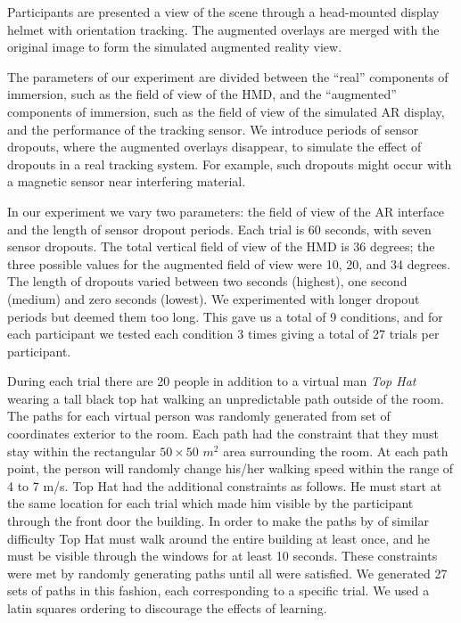 \documentclass{acmsiggraph}                     %
\begin{document}
Participants are presented a view of the scene through a head-mounted display helmet with orientation tracking.  The augmented overlays are merged with the original image to form the simulated augmented reality view.

The parameters of our experiment are divided between the ``real'' components of immersion, such as the field of view of the HMD, and the ``augmented'' components of immersion, such as the field of view of the simulated AR display, and the performance of the tracking sensor.  We introduce periods of sensor dropouts, where the augmented overlays disappear, to simulate the effect of dropouts in a real tracking system.  For example, such dropouts might occur with a magnetic sensor near interfering material.

In our experiment we vary two parameters: the field of view of the AR interface and the length of sensor dropout periods.  Each trial is 60 seconds, with seven sensor dropouts.  The total vertical field of view of the HMD is 36 degrees; the three possible values for the augmented field of view were 10, 20, and 34 degrees.  The length of dropouts varied between two seconds (highest), one second (medium) and zero seconds (lowest).  We experimented with longer dropout periods but deemed them too long.  This gave us a total of 9 conditions, and for each participant we tested each condition 3 times giving a total of 27 trials per participant.

During each trial there are 20 people in addition to a virtual man \emph{Top Hat} wearing a tall black top hat walking an unpredictable path outside of the room.  The paths for each virtual person was randomly generated from set of coordinates exterior to the room.  Each path had the constraint that they must stay within the rectangular $50\times50$ $m^2$ area surrounding the room.  At each path point, the person will randomly change his/her walking speed within the range of 4 to 7 m/s.  Top Hat had the additional constraints as follows.  He must start at the same location for each trial which made him visible by the participant through the front door the building.  In order to make the paths by of similar difficulty Top Hat must walk around the entire building at least once, and he must be visible through the windows for at least 10 seconds.  These constraints were met by randomly generating paths until all were satisfied.  We generated 27 sets of paths in this fashion, each corresponding to a specific trial.  We used a latin squares ordering to discourage the effects of learning.
\end{document}
